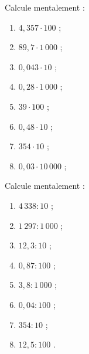 \begin{exercice}
Calcule mentalement :
\begin{enumerate} 
 \item $4,357 \cdot 100$ \dotfill ; \hspace*{11em}
 
 \item $89,7 \cdot 1\,000$ \dotfill ; \hspace*{11em}
 
 \item $0,043 \cdot 10$ \dotfill ; \hspace*{11em}
 
 \item $0,28 \cdot 1\,000$ \dotfill ; \hspace*{11em}
 
 \item $39 \cdot 100$ \dotfill ; \hspace*{11em}
 
 \item $0,48 \cdot 10$ \dotfill ; \hspace*{11em}
 	
 \item $354 \cdot 10$ \dotfill ; \hspace*{11em}
 	
 \item $0,03 \cdot 10\,000$ \dotfill ; \hspace*{11em}
 
 \end{enumerate}
\end{exercice}


\begin{exercice}
Calcule mentalement :
\begin{enumerate} 
 \item $4\,338 : 10$ \dotfill ; \hspace*{11em}
 
 \item $1\,297 : 1\,000$ \dotfill ; \hspace*{11em}
 	
 \item $12,3 : 10$ \dotfill ; \hspace*{11em}
 
 \item $0,87 : 100$ \dotfill ; \hspace*{11em}
 	
 \item $3,8 : 1\,000$ \dotfill ; \hspace*{11em}
 
 \item $0,04 : 100$ \dotfill ; \hspace*{11em}
 	
 \item $354 : 10$ \dotfill ; \hspace*{11em}
 
 \item $12,5 : 100$ \dotfill. \hspace*{11em}
 
 \end{enumerate}
\end{exercice}


